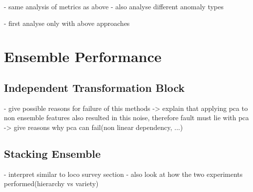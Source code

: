 - same analysis of metrics as above\newline
- also analyse different anomaly types\newline

- first analyse only with above approaches\newline



\section{Ensemble Performance}
\label{sec:ensemblediscussion}

\subsection{Independent Transformation Block}
\label{subsec:ITBfaildiscussion}

- give possible reasons for failure of this methods\newline
-> explain that applying pca to non ensemble features also resulted in this noise, therefore fault must lie with pca\newline
-> give reasons why pca can fail(non linear dependency, ...)\newline


\subsection{Stacking Ensemble}
\label{subsec:stackingdiscussion}

- interpret similar to loco survey section\newline
- also look at how the two experiments performed(hierarchy vs variety)\newline





